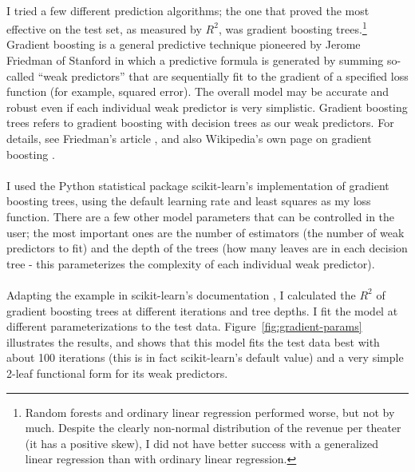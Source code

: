 \documentclass[10pt]{article}
\begin{document}
    \paragraph{}
    I tried a few different prediction algorithms; the one that proved the most effective on the test set, as measured by $R^2$, was gradient boosting trees.\footnote{Random forests and ordinary linear regression performed worse, but not by much. Despite the clearly non-normal distribution of the revenue per theater (it has a positive skew), I did not have better success with a generalized linear regression than with ordinary linear regression.} Gradient boosting is a general predictive technique pioneered by Jerome Friedman of Stanford in which a predictive formula is generated by summing so-called ``weak predictors'' that are sequentially fit to the gradient of a specified loss function (for example, squared error). The overall model may be accurate and robust even if each individual weak predictor is very simplistic. Gradient boosting trees refers to gradient boosting with decision trees as our weak predictors. For details, see Friedman's article \cite{bib:greedy-function}, and also Wikipedia's own page on gradient boosting \cite{bib:wikipedia-gradient-boosting}. 

    \paragraph{}
    I used the Python statistical package \textsf{scikit-learn}'s implementation of gradient boosting trees, using the default learning rate and least squares as my loss function. There are a few other model parameters that can be controlled in the user; the most important ones are the number of estimators (the number of weak predictors to fit) and the depth of the trees (how many leaves are in each decision tree - this parameterizes the complexity of each individual weak predictor). 
    
    \paragraph{}
    Adapting the example in \textsf{scikit-learn}'s documentation \cite{bib:scikit-ensemble}, I calculated the $R^2$ of gradient boosting trees at different iterations and tree depths. I fit the model at different parameterizations to the test data. Figure~\ref{fig:gradient-params} illustrates the results, and shows that this model fits the test data best with about 100 iterations (this is in fact \textsf{scikit-learn}'s default value) and a very simple 2-leaf functional form for its weak predictors. 
    
\end{document}
